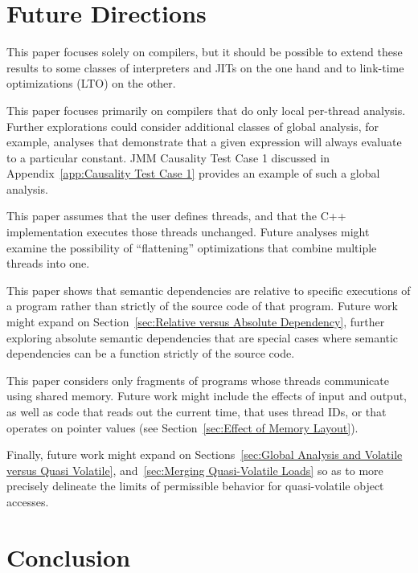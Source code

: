 \documentclass[10]{article}
\begin{document}
\section{Future Directions}
\label{sec:Future Directions}

This paper focuses solely on compilers, but it should be possible to
extend these results to some classes of interpreters and JITs on the
one hand and to link-time optimizations (LTO) on the other.

This paper focuses primarily on compilers that do only local per-thread
analysis.
Further explorations could consider additional classes of global analysis,
for example, analyses that demonstrate that a given expression will
always evaluate to a particular constant.
JMM Causality Test Case 1 discussed in
Appendix~\ref{app:Causality Test Case 1}
provides an example of such a global analysis.

This paper assumes that the user defines threads, and that the
C++ implementation executes those threads unchanged.
Future analyses might examine the possibility of ``flattening''
optimizations that combine multiple threads into one.

This paper shows that semantic dependencies are relative to specific
executions of a program rather than strictly of the source code of that
program.
Future work might expand on
Section~\ref{sec:Relative versus Absolute Dependency},
further exploring absolute semantic dependencies that are special cases
where semantic dependencies can be a function strictly of the source code.

This paper considers only fragments of programs whose threads
communicate using shared memory.
Future work might include the effects of input and output, as well as
code that reads out the current time, that uses thread IDs, or that
operates on pointer values
(see Section~\ref{sec:Effect of Memory Layout}).

Finally, future work might expand on
Sections~\ref{sec:Global Analysis and Volatile versus Quasi Volatile},
and~\ref{sec:Merging Quasi-Volatile Loads}
so as to more precisely delineate the limits of permissible
behavior for quasi-volatile object accesses.

\section{Conclusion}
\label{sec:Conclusion}
\end{document}
